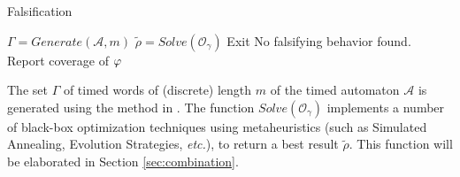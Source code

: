 \begin{algorithm}
\caption{Falsification}
\begin{algorithmic}
		\State $\Gamma = Generate(\mathcal{A},m)$
	        \ForAll{$\gamma \in \Gamma$} 
		\State $\tilde{\rho} = Solve(\mathcal{O}_{\gamma})$
		  \State Exit	
		\EndIf
		\EndFor
		\State No falsifying behavior found. Report coverage of $\varphi$
\end{algorithmic}
\end{algorithm}
The set $\Gamma$ of timed words of (discrete) length $m$ of the timed automaton $\mathcal{A}$ is generated using the method in \cite{BBBK16}. The function $Solve(\mathcal{O}_{\gamma})$ implements a number of black-box optimization techniques using metaheuristics (such as Simulated Annealing, Evolution Strategies, {\it etc.}), to return a best result $\tilde{\rho}$. This function will be elaborated in Section \ref{sec:combination}.



